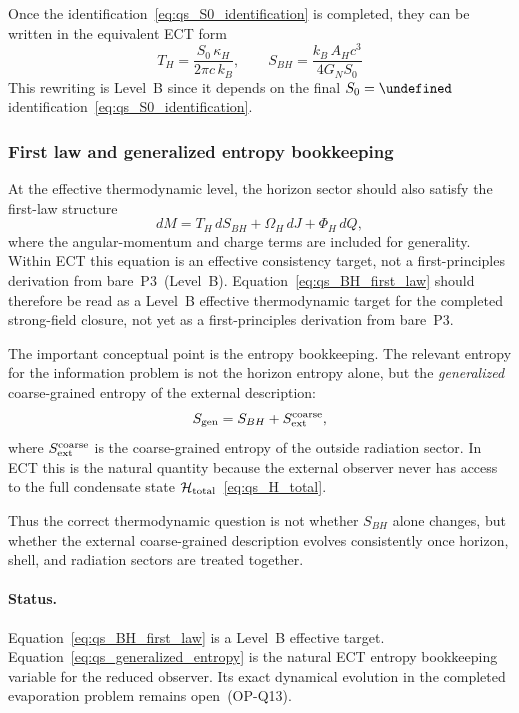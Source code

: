 \documentclass[11pt,a4paper]{article}
\let\hbar\undefined
\numberwithin{equation}{section}
\begin{document}
Once the identification~\eqref{eq:qs_S0_identification} is completed,
they can be written in the equivalent ECT form
\begin{equation}
  \label{eq:qs_Hawking_temp_S0}
  T_H
  =
  \frac{S_0\,\kappa_H}{2\pi c\,k_B},
  \qquad
  S_{BH}
  =
  \frac{k_B\,A_H c^3}{4G_N S_0}
\end{equation}
This rewriting is Level~B since it depends on the final
$S_0=\hbar$ identification~\eqref{eq:qs_S0_identification}.

\subsubsection*{First law and generalized entropy bookkeeping}

At the effective thermodynamic level, the horizon sector should also
satisfy the first-law structure
\begin{equation}
  \label{eq:qs_BH_first_law}
  dM = T_H\,dS_{BH} + \Omega_H\,dJ + \Phi_H\,dQ,
\end{equation}
where the angular-momentum and charge terms are included for generality.
Within ECT this equation is an effective consistency target, not a
first-principles derivation from bare~P3~(Level~B).
Equation~\eqref{eq:qs_BH_first_law} should therefore be read as a
Level~B effective thermodynamic target for the completed strong-field
closure, not yet as a first-principles derivation from bare~P3.

The important conceptual point is the entropy bookkeeping.
The relevant entropy for the information problem is not the horizon
entropy alone, but the \emph{generalized} coarse-grained entropy of the
external description:
\begin{equation}
  \label{eq:qs_generalized_entropy}
  S_{\rm gen}
  = S_{BH} + S_{\rm ext}^{\rm coarse},
\end{equation}
where $S_{\rm ext}^{\rm coarse}$ is the coarse-grained entropy of the
outside radiation sector.
In ECT this is the natural quantity because the external observer never
has access to the full condensate state
$\mathcal{H}_{\rm total}$~\eqref{eq:qs_H_total}.

Thus the correct thermodynamic question is not whether $S_{BH}$ alone
changes, but whether the external coarse-grained description evolves
consistently once horizon, shell, and radiation sectors are treated
together.

\paragraph{Status.}
Equation~\eqref{eq:qs_BH_first_law} is a Level~B effective target.
Equation~\eqref{eq:qs_generalized_entropy} is the natural ECT entropy
bookkeeping variable for the reduced observer.
Its exact dynamical evolution in the completed evaporation problem
remains open~(OP-Q13).
\end{document}

